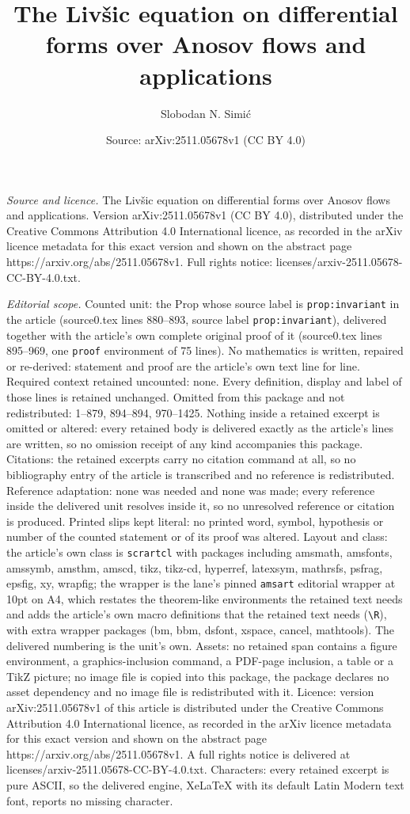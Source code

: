 \documentclass[10pt,a4paper]{amsart}
\title[The Liv\v{s}ic equation on differential forms over Anosov fl]{The Liv\v{s}ic equation on differential forms over Anosov flows and applications}
\author{Slobodan N. Simi\'c}
\date{Source: arXiv:2511.05678v1 (CC BY 4.0)}
\begin{document}
\maketitle

\noindent\emph{Source and licence.} The Liv\v{s}ic equation on differential forms over Anosov flows and applications. Version arXiv:2511.05678v1 (CC BY 4.0), distributed under the Creative Commons Attribution 4.0 International licence, as recorded in the arXiv licence metadata for this exact version and shown on the abstract page https://arxiv.org/abs/2511.05678v1. Full rights notice: licenses/arxiv-2511.05678-CC-BY-4.0.txt.\par\smallskip

\noindent\textit{Editorial scope.} Counted unit: the Prop whose source label is \texttt{prop:invariant} in the article (source0.tex lines 880--893, source label \texttt{prop:invariant}), delivered together with the article's own complete original proof of it (source0.tex lines 895--969, one \texttt{proof} environment of 75 lines). No mathematics is written, repaired or re-derived: statement and proof are the article's own text line for line. Required context retained uncounted: none. Every definition, display and label of those lines is retained unchanged. Omitted from this package and not redistributed: 1--879, 894--894, 970--1425. Nothing inside a retained excerpt is omitted or altered: every retained body is delivered exactly as the article's lines are written, so no omission receipt of any kind accompanies this package. Citations: the retained excerpts carry no citation command at all, so no bibliography entry of the article is transcribed and no reference is redistributed. Reference adaptation: none was needed and none was made; every reference inside the delivered unit resolves inside it, so no unresolved reference or citation is produced. Printed slips kept literal: no printed word, symbol, hypothesis or number of the counted statement or of its proof was altered. Layout and class: the article's own class is \texttt{scrartcl} with packages including amsmath, amsfonts, amssymb, amsthm, amscd, tikz, tikz-cd, hyperref, latexsym, mathrsfs, psfrag, epsfig, xy, wrapfig; the wrapper is the lane's pinned \texttt{amsart} editorial wrapper at 10pt on A4, which restates the theorem-like environments the retained text needs and adds the article's own macro definitions that the retained text needs (\texttt{\textbackslash R}), with extra wrapper packages (bm, bbm, dsfont, xspace, cancel, mathtools). The delivered numbering is the unit's own. Assets: no retained span contains a figure environment, a graphics-inclusion command, a PDF-page inclusion, a table or a TikZ picture; no image file is copied into this package, the package declares no asset dependency and no image file is redistributed with it. Licence: version arXiv:2511.05678v1 of this article is distributed under the Creative Commons Attribution 4.0 International licence, as recorded in the arXiv licence metadata for this exact version and shown on the abstract page https://arxiv.org/abs/2511.05678v1. A full rights notice is delivered at licenses/arxiv-2511.05678-CC-BY-4.0.txt. Characters: every retained excerpt is pure ASCII, so the delivered engine, XeLaTeX with its default Latin Modern text font, reports no missing character.
\end{document}

